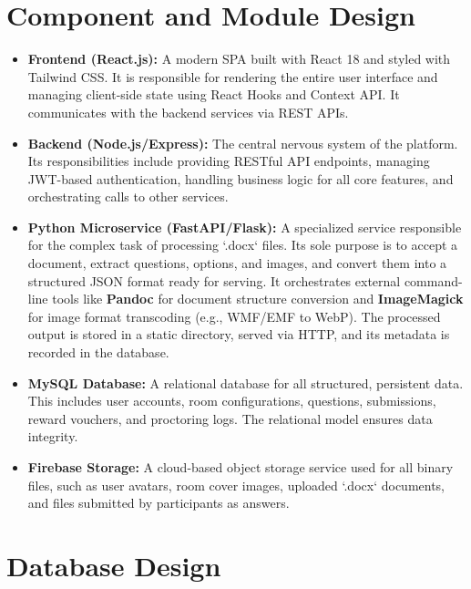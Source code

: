 \section{Component and Module Design}
\label{sec:arch-components}
\begin{itemize}
    \item \textbf{Frontend (React.js):} A modern SPA built with React 18 and styled with Tailwind CSS. It is responsible for rendering the entire user interface and managing client-side state using React Hooks and Context API. It communicates with the backend services via REST APIs.

    \item \textbf{Backend (Node.js/Express):} The central nervous system of the platform. Its responsibilities include providing RESTful API endpoints, managing JWT-based authentication, handling business logic for all core features, and orchestrating calls to other services.

    \item \textbf{Python Microservice (FastAPI/Flask):} A specialized service responsible for the complex task of processing `.docx` files. Its sole purpose is to accept a document, extract questions, options, and images, and convert them into a structured JSON format ready for serving. It orchestrates external command-line tools like \textbf{Pandoc} for document structure conversion and \textbf{ImageMagick} for image format transcoding (e.g., WMF/EMF to WebP). The processed output is stored in a static directory, served via HTTP, and its metadata is recorded in the database.

    \item \textbf{MySQL Database:} A relational database for all structured, persistent data. This includes user accounts, room configurations, questions, submissions, reward vouchers, and proctoring logs. The relational model ensures data integrity.

    \item \textbf{Firebase Storage:} A cloud-based object storage service used for all binary files, such as user avatars, room cover images, uploaded `.docx` documents, and files submitted by participants as answers.
\end{itemize}

\section{Database Design}
\label{sec:arch-database}

